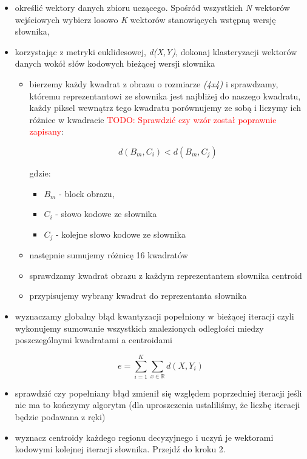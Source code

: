 \documentclass{article}
\newcommand{\todo}[1]{\textcolor{red}{TODO: #1}}
\begin{document}
\begin{itemize} 
\item określić wektory danych zbioru uczącego. Spośród wszystkich \textit{N} wektorów wejściowych wybierz losowo \textit{K} wektorów stanowiących wstępną wersję słownika,
\item korzystając z metryki euklidesowej, \textit{d(X,Y)}, dokonaj klasteryzacji wektorów danych wokół słów kodowych bieżącej wersji słownika
     \begin{itemize}
        \item bierzemy każdy kwadrat z obrazu o rozmiarze \textit{(4x4)} i sprawdzamy, któremu reprezentantowi ze słownika jest najbliżej do 
        naszego kwadratu, każdy piksel wewnątrz tego kwadratu porównujemy ze sobą i liczymy ich różnice w kwadracie 
        \todo{Sprawdzić czy wzór został poprawnie zapisany}:
        
		\begin{equation}
		d(B_{m}, C_{i}) < d(B_{m}, C_{j})
		\end{equation}
		
		gdzie:
		\begin{itemize}[label=]
    		\item $B_{m}$ - block obrazu,
    		\item $C_{i}$ - słowo kodowe ze słownika
    		\item $C_{j}$ - kolejne słowo kodowe ze słownika
		\end{itemize}	        
        
        \item następnie sumujemy różnicę 16 kwadratów
        \item sprawdzamy kwadrat obrazu z każdym reprezentantem słownika centroid
        \item przypisujemy wybrany kwadrat do reprezentanta słownika
     \end{itemize}
\item wyznaczamy globalny błąd kwantyzacji popełniony w bieżącej iteracji czyli wykonujemy sumowanie wszystkich znalezionych odległości miedzy poszczególnymi kwadratami a centroidami 
 
\begin{equation}
e = \sum_{i=1}^K \sum_{x\in\mathbb{R}} d(X, Y_{i}) 
\end{equation}

\item sprawdzić czy popełniany błąd zmienił się względem poprzedniej iteracji jeśli nie ma to kończymy algorytm (dla uproszczenia ustaliliśmy, że liczbę iteracji będzie podawana z ręki)
\item wyznacz centroidy każdego regionu decyzyjnego i uczyń je wektorami kodowymi kolejnej iteracji słownika. Przejdź do kroku 2. 
\end{itemize}
 
\end{document}
